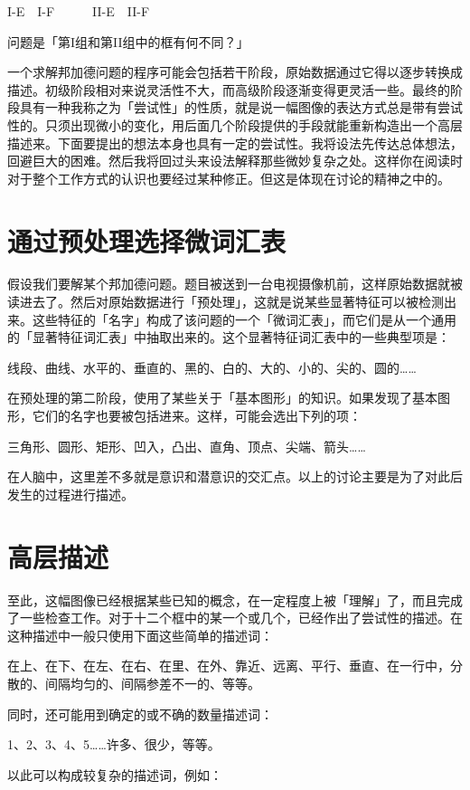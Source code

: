 \documentclass[
  12pt,
  twoside,
  openright,
  oldfontcommands,
]{memoir}
\begin{document}
I-E　I-F　　　II-E　II-F

问题是「第I组和第II组中的框有何不同？」

一个求解邦加德问题的程序可能会包括若干阶段，原始数据通过它得以逐步转换成描述。初级阶段相对来说灵活性不大，而高级阶段逐渐变得更灵活一些。最终的阶段具有一种我称之为「尝试性」的性质，就是说一幅图像的表达方式总是带有尝试性的。只须出现微小的变化，用后面几个阶段提供的手段就能重新构造出一个高层描述来。下面要提出的想法本身也具有一定的尝试性。我将设法先传达总体想法，回避巨大的困难。然后我将回过头来设法解释那些微妙复杂之处。这样你在阅读时对于整个工作方式的认识也要经过某种修正。但这是体现在讨论的精神之中的。

\section{通过预处理选择微词汇表}

假设我们要解某个邦加德问题。题目被送到一台电视摄像机前，这样原始数据就被读进去了。然后对原始数据进行「预处理」，这就是说某些显著特征可以被检测出来。这些特征的「名字」构成了该问题的一个「微词汇表」，而它们是从一个通用的「显著特征词汇表」中抽取出来的。这个显著特征词汇表中的一些典型项是：

线段、曲线、水平的、垂直的、黑的、白的、大的、小的、尖的、圆的\ldots\ldots{}

在预处理的第二阶段，使用了某些关于「基本图形」的知识。如果发现了基本图形，它们的名字也要被包括进来。这样，可能会选出下列的项：

三角形、圆形、矩形、凹入，凸出、直角、顶点、尖端、箭头\ldots\ldots{}

在人脑中，这里差不多就是意识和潜意识的交汇点。以上的讨论主要是为了对此后发生的过程进行描述。

\section{高层描述}

至此，这幅图像已经根据某些已知的概念，在一定程度上被「理解」了，而且完成了一些检查工作。对于十二个框中的某一个或几个，已经作出了尝试性的描述。在这种描述中一般只使用下面这些简单的描述词：

在上、在下、在左、在右、在里、在外、靠近、远离、平行、垂直、在一行中，分散的、间隔均匀的、间隔参差不一的、等等。

同时，还可能用到确定的或不确的数量描述词：

1、2、3、4、5\ldots\ldots 许多、很少，等等。

以此可以构成较复杂的描述词，例如：
\end{document}
